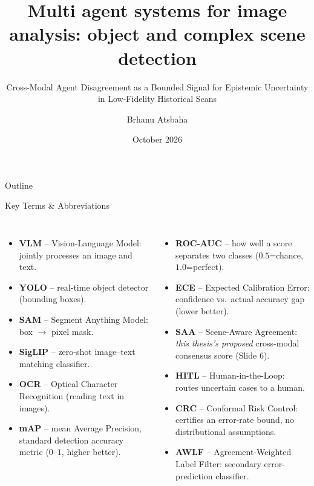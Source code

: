 \documentclass[aspectratio=169,11pt]{beamer}
\title[Multi Agent Systems for Image Analysis]{Multi agent systems for image analysis: object and complex scene detection}
\subtitle{Cross-Modal Agent Disagreement as a Bounded Signal for Epistemic Uncertainty in Low-Fidelity Historical Scans}
\author{Brhanu Atsbaha}
\institute{Universität Hildesheim\\[0.15cm]\small \textbf{Advisors:} Prof. Dr. Thomas Mandl \& Shereen Elsayed}
\date{October 2026}
\begin{document}
\begin{frame}
  \titlepage
\end{frame}

\begin{frame}{Outline}
\tableofcontents
\end{frame}

\begin{frame}{Key Terms \& Abbreviations}
\scriptsize
\begin{columns}[T]
\begin{itemize}
  \item \textbf{VLM} -- Vision-Language Model: jointly processes an image and text.
  \item \textbf{YOLO} -- real-time object detector (bounding boxes).
  \item \textbf{SAM} -- Segment Anything Model: box $\to$ pixel mask.
  \item \textbf{SigLIP} -- zero-shot image--text matching classifier.
  \item \textbf{OCR} -- Optical Character Recognition (reading text in images).
  \item \textbf{mAP} -- mean Average Precision, standard detection accuracy metric ($0$--$1$, higher better).
\end{itemize}
\begin{itemize}
  \item \textbf{ROC-AUC} -- how well a score separates two classes ($0.5$=chance, $1.0$=perfect).
  \item \textbf{ECE} -- Expected Calibration Error: confidence vs.\ actual accuracy gap (lower better).
  \item \textbf{SAA} -- Scene-Aware Agreement: \emph{this thesis's proposed} cross-modal consensus score (Slide 6).
  \item \textbf{HITL} -- Human-in-the-Loop: routes uncertain cases to a human.
  \item \textbf{CRC} -- Conformal Risk Control: certifies an error-rate bound, no distributional assumptions.
  \item \textbf{AWLF} -- Agreement-Weighted Label Filter: secondary error-prediction classifier.
\end{itemize}
\end{columns}
\end{frame}
\end{document}
